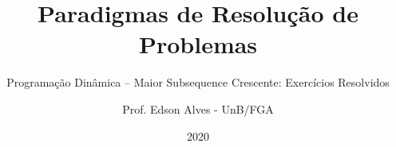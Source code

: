\title{Paradigmas de Resolução de Problemas}
\subtitle{Programação Dinâmica -- Maior Subsequence Crescente: Exercícios Resolvidos}
\author{Prof. Edson Alves - UnB/FGA}
\date{2020}
